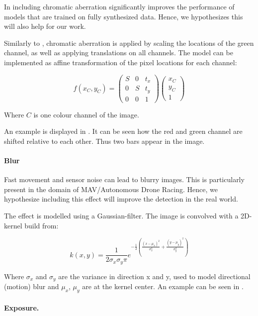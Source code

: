 In \cite{Carlson2018} including chromatic aberration significantly improves the performance of models that are trained on fully synthesized data. Hence, we hypothesizes this will also help for our work.

Similarly to \cite{Carlson2018}, chromatic aberration is applied by scaling the locations of the green channel, as well as applying translations on all channels. The model can be implemented as affine transformation of the pixel locations for each channel:

\begin{equation}
f(x_C,y_C) = \begin{pmatrix}
S & 0 & t_x \\
0 & S & t_y \\
0 & 0 & 1
\end{pmatrix} \begin{pmatrix}
x_C \\
y_C \\
1
\end{pmatrix}
\end{equation}

Where $C$ is one colour channel of the image.

An example is displayed in . It can be seen how the red and green channel are shifted relative to each other. Thus two bars appear in the image.

\paragraph{Blur}

Fast movement and sensor noise can lead to blurry images. This is particularly present in the domain of \ac{MAV}/Autonomous Drone Racing. Hence, we hypothesize including this effect will improve the detection in the real world. 

The effect is modelled using a Gaussian-filter. The image is convolved with a 2D-kernel build from:

\begin{equation}
k(x,y) = \frac{1}{2\sigma_x\sigma_y\pi}e^{-\frac{1}{2}({\frac{(x-\mu_x)^2}{\sigma_x^2} + \frac{(y-\mu_y)^2}{\sigma_y^2}})}
\end{equation}

Where $\sigma_x$ and $\sigma_y$ are the variance in direction x and y, used to model directional (motion) blur and $\mu_x$, $\mu_y$ are at the kernel center. An example can be seen in .

\paragraph{Exposure.}

